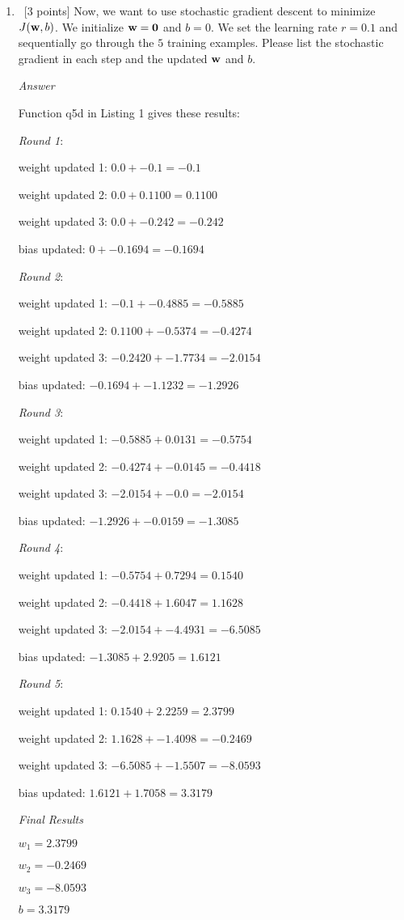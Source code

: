 \documentclass[12pt, fullpage,letterpaper]{article}
\begin{document}
\begin{enumerate}
\begin{enumerate}
	\item~[3 points] Now, we want to use stochastic gradient descent to minimize $J({\bf w}, b)$. We initialize ${\bf w} = {\bf 0}$ and $b = 0$. We set the learning rate $r = 0.1$ and sequentially go through the $5$ training examples. Please list the stochastic gradient in each step and the updated ${\bf w}$ and $b$. 
	
	\emph{Answer}
	
	Function q5d in Listing 1 gives these results:
	
	\emph{Round 1}:
	
	weight updated 1: $0.0 + -0.1 = -0.1$
	
	weight updated 2: $0.0 + 0.1100 = 0.1100$
    
    weight updated 3: $0.0 + -0.242 = -0.242$
    
    bias updated: $0 + -0.1694 = -0.1694$
    
    \emph{Round 2}:
    
    weight updated 1: $-0.1 + -0.4885 = -0.5885$
    
    weight updated 2: $0.1100 + -0.5374 = -0.4274$
    
    weight updated 3: $-0.2420 + -1.7734 = -2.0154$
    
    bias updated: $-0.1694 + -1.1232 = -1.2926$
    
    \emph{Round 3}:
    
    weight updated 1: $-0.5885 + 0.0131 = -0.5754$
    
    weight updated 2: $-0.4274 + -0.0145 = -0.4418$
    
    weight updated 3: $-2.0154 + -0.0 = -2.0154$
    
    bias updated: $-1.2926 + -0.0159 = -1.3085$
    
    \emph{Round 4}:
    
    weight updated 1: $-0.5754 + 0.7294 = 0.1540$
    
    weight updated 2: $-0.4418 + 1.6047 = 1.1628$
    
    weight updated 3: $-2.0154 + -4.4931 = -6.5085$
    
    bias updated: $-1.3085 + 2.9205 = 1.6121$
    
    \emph{Round 5}:
    
    weight updated 1: $0.1540 + 2.2259 = 2.3799$
    
    weight updated 2: $1.1628 + -1.4098 = -0.2469$
    
    weight updated 3: $-6.5085 + -1.5507 = -8.0593$
    
    bias updated: $1.6121 + 1.7058 = 3.3179$
    
    \emph{Final Results}
    
    $w_1 = 2.3799$
    
    $w_2 = -0.2469$
    
    $w_3 = -8.0593$
    
    $b = 3.3179$
	
\end{enumerate}
\end{enumerate}
\end{document}

